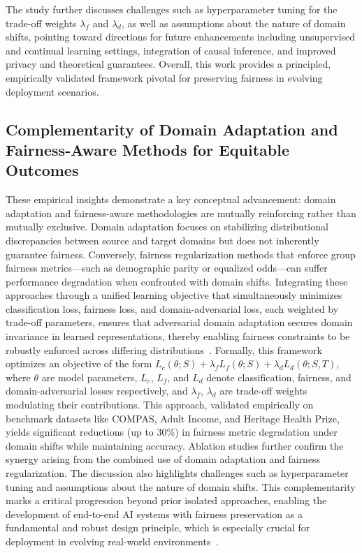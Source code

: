 \documentclass[sigconf]{acmart}
\begin{document}
The study further discusses challenges such as hyperparameter tuning for the trade-off weights \(\lambda_f\) and \(\lambda_d\), as well as assumptions about the nature of domain shifts, pointing toward directions for future enhancements including unsupervised and continual learning settings, integration of causal inference, and improved privacy and theoretical guarantees. Overall, this work provides a principled, empirically validated framework pivotal for preserving fairness in evolving deployment scenarios.

\subsection{Complementarity of Domain Adaptation and Fairness-Aware Methods for Equitable Outcomes}

These empirical insights demonstrate a key conceptual advancement: domain adaptation and fairness-aware methodologies are mutually reinforcing rather than mutually exclusive. Domain adaptation focuses on stabilizing distributional discrepancies between source and target domains but does not inherently guarantee fairness. Conversely, fairness regularization methods that enforce group fairness metrics—such as demographic parity or equalized odds—can suffer performance degradation when confronted with domain shifts. Integrating these approaches through a unified learning objective that simultaneously minimizes classification loss, fairness loss, and domain-adversarial loss, each weighted by trade-off parameters, ensures that adversarial domain adaptation secures domain invariance in learned representations, thereby enabling fairness constraints to be robustly enforced across differing distributions~\cite{ref26}. Formally, this framework optimizes an objective of the form $L_c(\theta; S) + \lambda_f L_f(\theta; S) + \lambda_d L_d(\theta; S, T)$, where $\theta$ are model parameters, $L_c$, $L_f$, and $L_d$ denote classification, fairness, and domain-adversarial losses respectively, and $\lambda_f$, $\lambda_d$ are trade-off weights modulating their contributions. This approach, validated empirically on benchmark datasets like COMPAS, Adult Income, and Heritage Health Prize, yields significant reductions (up to 30\%) in fairness metric degradation under domain shifts while maintaining accuracy. Ablation studies further confirm the synergy arising from the combined use of domain adaptation and fairness regularization. The discussion also highlights challenges such as hyperparameter tuning and assumptions about the nature of domain shifts. This complementarity marks a critical progression beyond prior isolated approaches, enabling the development of end-to-end AI systems with fairness preservation as a fundamental and robust design principle, which is especially crucial for deployment in evolving real-world environments~\cite{ref26}.
\end{document}

